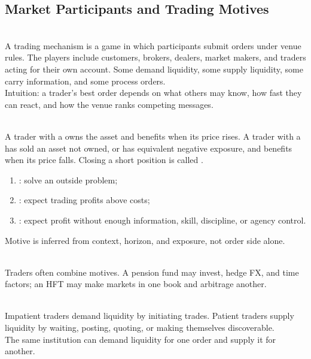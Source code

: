 \subsection{Market Participants and Trading Motives}

\begin{model} \\
A trading mechanism is a game in which participants submit orders under venue rules. The players include customers, brokers, dealers, market makers, and traders acting for their own account. Some demand liquidity, some supply liquidity, some carry information, and some process orders.\\
Intuition: a trader's best order depends on what others may know, how fast they can react, and how the venue ranks competing messages.
\end{model}

\begin{notation} \\
A trader with a  owns the asset and benefits when its price rises. A trader with a  has sold an asset not owned, or has equivalent negative exposure, and benefits when its price falls. Closing a short position is called .
\end{notation}

\begin{taxonomy} 
\begin{enumerate}[label=\roman*.]
\setlength{\itemsep}{0pt}
\item {}: solve an outside problem;
\item {}: expect trading profits above costs;
\item {}: expect profit without enough information, skill, discipline, or agency control.
\end{enumerate}
Motive is inferred from context, horizon, and exposure, not order side alone.
\end{taxonomy}

\begin{caveat} \\
Traders often combine motives. A pension fund may invest, hedge FX, and time factors; an HFT may make markets in one book and arbitrage another.
\end{caveat}

\begin{principle} \\
Impatient traders demand liquidity by initiating trades. Patient traders supply liquidity by waiting, posting, quoting, or making themselves discoverable.\\
The same institution can demand liquidity for one order and supply it for another.
\end{principle}

